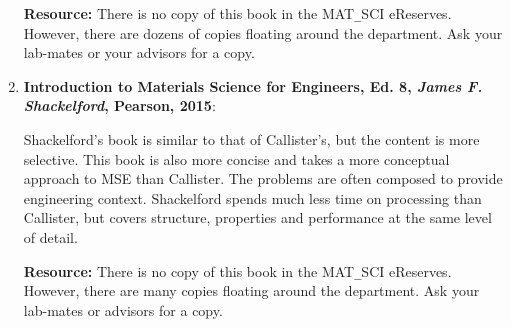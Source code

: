 \begin{enumerate}
	\textbf{Resource:} There is no copy of this book in the MAT\texttt{\_}SCI eReserves. However, there are dozens of copies floating around the department. Ask your lab-mates or your advisors for a copy. 
	
	\vspace{2em}
	\item \large \textbf{Introduction to Materials Science for Engineers, Ed. 8,\newline 
	\textit{James F. Shackelford}, Pearson, 2015}:\normalsize
	
	Shackelford's book is similar to that of Callister's, but the content is more selective. This book is also more concise and takes a more conceptual approach to MSE than Callister. The problems are often composed to provide engineering context. Shackelford spends much less time on processing than Callister, but covers structure, properties and performance at the same level of detail.
	
		\textbf{Resource:} There is no copy of this book in the MAT\texttt{\_}SCI eReserves. However, there are many copies floating around the department. Ask your lab-mates or advisors for a copy.
		
\end{enumerate}



